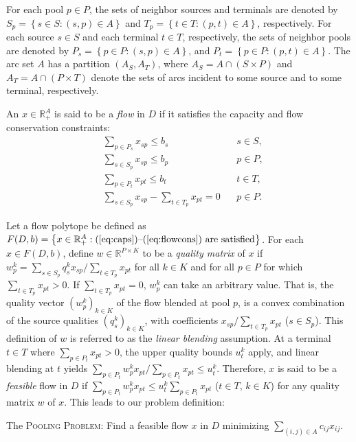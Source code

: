 \documentclass[smallcondensed]{svjour3}
\begin{document}
For each pool $p\in P$, the sets of neighbor sources and terminals are denoted by
$S_p=\left\{s\in S: (s,p)\in A\right\}$ and
$T_p=\left\{t\in T: (p,t)\in A\right\}$, respectively.
For each source $s\in S$ and each terminal $t\in T$, respectively,
the sets of neighbor pools are denoted by
$P_s=\left\{p\in P: (s,p)\in A\right\}$, and
$P_t=\left\{p\in P: (p,t)\in A\right\}$.
The arc set $A$ has a partition $\left(A_S,A_T\right)$, where $A_S=A\cap\left(S\times P\right)$ and $A_T=A\cap\left(P\times T\right)$
denote the sets of arcs incident to some source and to some terminal, respectively.

An $x\in\mathbb{R}_+^A$ is said to be a \emph{flow} in $D$ if it satisfies the capacity and flow conservation constraints:
\begin{eqnarray}
           & \sum_{p\in P_s}x_{sp}\leq b_s & s\in S, \label{eq:caps} \\
           & \sum_{s\in S_p}x_{sp}\leq b_p & p\in P, \label{eq:capi} \\
           & \sum_{p\in P_t}x_{pt}\leq b_t & t\in T, \label{eq:capt} \\
           & \sum_{s\in S_p}x_{sp}-\sum_{t\in T_p}x_{pt} = 0~~~~ & p\in P. \label{eq:flowcons}
\end{eqnarray}

\noindent
Let a flow polytope be defined as $F(D,b) = \left\{x\in\mathbb{R}_+^A: \mbox{(\ref{eq:caps})--(\ref{eq:flowcons}) are satisfied}\right\}$.
For each $x\in F(D,b)$, define $w\in\mathbb{R}^{P\times K}$ to be a \emph{quality matrix} of $x$ if
$w_p^k=\sum_{s\in S_p}q_s^kx_{sp}/\sum_{t\in T_p}x_{pt}$ for all $k\in K$ and for all $p\in P$ for which
$\sum_{t\in T_p}x_{pt}>0$.
If $\sum_{t\in T_p}x_{pt}=0$, $w_p^k$ can take an arbitrary value.
That is, the quality vector $\left(w_p^k\right)_{k\in K}$ of the flow blended at pool $p$, is a convex combination of the source qualities $\left(q_s^k\right)_{k\in K}$,
with coefficients $x_{sp}/\sum_{t\in T_p}x_{pt}$ ($s\in S_p$).
This definition of $w$ is referred to as the \emph{linear blending} assumption.
At a terminal $t\in T$ where $\sum_{p\in P_t}x_{pt}>0$, the upper quality bounds $u_t^k$ apply,
and linear blending at $t$ yields $\sum_{p\in P_t}w_p^kx_{pt}/\sum_{p\in P_t}x_{pt}\leq u_t^k$.
Therefore, $x$ is said to be a \emph{feasible} flow in $D$ if $\sum_{p\in P_t}w_p^kx_{pt}\leq u_t^k\sum_{p\in P_t}x_{pt}$ ($t\in T$, $k\in K$)
for any quality matrix $w$ of $x$.
This leads to our problem definition:

\begin{problem} \label{prob:p} The \textsc{Pooling Problem}:
Find a feasible flow $x$ in $D$ minimizing $\sum_{(i,j)\in A}c_{ij}x_{ij}$.
\end{problem}
\end{document}
